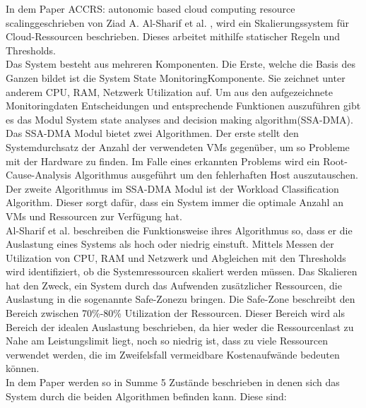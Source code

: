 \documentclass[a4paper,10pt]{scrartcl}
\begin{document}
In dem Paper \glqq ACCRS: autonomic based cloud computing resource scaling\grqq geschrieben von Ziad A. Al-Sharif et al. \cite{AlSharif.2016} , wird ein Skalierungssystem für Cloud-Ressourcen beschrieben. Dieses arbeitet mithilfe statischer Regeln und Thresholds.\\
Das System besteht aus mehreren Komponenten. Die Erste, welche die Basis des Ganzen bildet ist die \glqq System State Monitoring\grqq Komponente. Sie zeichnet unter anderem CPU, RAM, Netzwerk Utilization auf. Um aus den aufgezeichnete Monitoringdaten Entscheidungen und entsprechende Funktionen auszuführen gibt es das Modul \glqq System state analyses and decision making algorithm\grqq(SSA-DMA). Das SSA-DMA Modul bietet zwei Algorithmen. Der erste stellt den Systemdurchsatz der Anzahl der verwendeten VMs gegenüber, um so Probleme mit der Hardware zu finden. Im Falle eines erkannten Problems wird ein Root-Cause-Analysis Algorithmus ausgeführt um den fehlerhaften Host auszutauschen.\\
Der zweite Algorithmus im SSA-DMA Modul ist der \glqq Workload Classification Algorithm\grqq.
Dieser sorgt dafür, dass ein System immer die optimale Anzahl an VMs und Ressourcen zur Verfügung hat.\\
Al-Sharif et al.  beschreiben die Funktionsweise ihres Algorithmus so, dass er die Auslastung eines Systems als hoch oder niedrig einstuft. Mittels Messen der Utilization von CPU, RAM und Netzwerk und Abgleichen mit den Thresholds wird identifiziert, ob die Systemressourcen skaliert werden müssen. Das Skalieren hat den Zweck, ein System durch das Aufwenden zusätzlicher Ressourcen, die Auslastung in die sogenannte \glqq Safe-Zone\grqq zu bringen. Die Safe-Zone beschreibt den Bereich zwischen 70\%-80\% Utilization der Ressourcen. Dieser Bereich wird als Bereich der idealen Auslastung beschrieben, da hier weder die Ressourcenlast zu Nahe am Leistungslimit liegt, noch so niedrig ist, dass zu viele Ressourcen verwendet werden, die im Zweifelsfall vermeidbare Kostenaufwände bedeuten können.\\
In dem Paper werden so in Summe 5 Zustände beschrieben in denen sich das System durch die beiden Algorithmen befinden kann. Diese sind:
\end{document}
